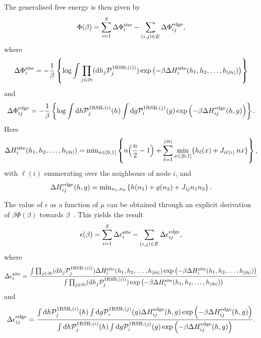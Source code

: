 \documentclass[11pt,a4paper]{article}
\begin{document}
The generalised free energy is then given by 
\begin{equation}
\Phi(\beta) = \sum^S_{i=1}\Delta \Phi^{\rm site}_i - \sum_{(i,j)\in E}\Delta \Phi^{\rm edge}_{ij},
\end{equation}
where 
\begin{eqnarray}
\Delta \Phi^{\rm site}_i =  -\frac{1}{\beta} \left\{ \log  \int \prod_{j\in \partial i}({\rm d}h_j \mathcal{P}^{{\rm 1RSB},(i))}_j)  \exp\left(-\beta \Delta H^{\rm site}_i(h_{1},h_2,\ldots,h_{|\partial i|}) \right) \right\}
\end{eqnarray}
and 
\begin{equation}
\Delta \Phi^{\rm edge}_{ij} = -\frac{1}{\beta} \left\{ \log  \int  {\rm d}h \mathcal{P}^{{\rm 1RSB},(i)}_j(h)   \int  {\rm d}g \mathcal{P}^{{\rm 1RSB},(j)}_i (g)   \exp\left(-\beta \Delta H^{\rm edge}_{ij}(h,g) \right) \right\} . 
\end{equation}
Here  
\begin{eqnarray}
\Delta H^{\rm site}_i(h_{1},h_2,\ldots,h_{|\partial i|}) = {\rm min}_{n\in [0,1]}\left\{ n\!\left(\frac{n}{2}-1\right)
      + \sum^{|\partial i|}_{\ell=1 } \min_{x\in[0,1]}\{h_\ell(x)+J_{ i \ell(i)} \:  n x\}\right\}, 
\end{eqnarray}
with $\ell(i)$ enumerating over the neighbours of node $i$,
and 
\begin{eqnarray}
\Delta H^{\rm edge}_{ij}(h,g) = {\rm min}_{n_1,n_2} \left\{h(n_1) +  g(n_2) + J_{ij}n_1n_2\right\}.
\end{eqnarray}



The value of $\epsilon$ as a function of $\mu$ can be obtained through an explicit derivation of $\beta\Phi(\beta)$ towards $\beta$~\cite{mezard2003cavity}.  This yields the result 
\begin{equation}
\epsilon(\beta) = \sum^S_{i=1}\Delta \epsilon^{\rm site}_i - \sum_{(i,j)\in E}\Delta \epsilon^{\rm edge}_{ij},
\end{equation} 
where 
\begin{equation}
\Delta \epsilon^{\rm site}_i = \frac{\int \prod_{j\in \partial i}({\rm d}h_j \mathcal{P}^{{\rm 1RSB},(i))}_j)   \Delta H^{\rm site}_i(h_{1},h_2,\ldots,h_{|\partial i|})\exp\left(-\beta \Delta H^{\rm site}_i(h_{1},h_2,\ldots,h_{|\partial i|}) \right)}{\int \prod_{j\in \partial i}({\rm d}h_j \mathcal{P}^{{\rm 1RSB},(i))}_j)  \exp\left(-\beta \Delta H^{\rm site}_i(h_{1},h_2,\ldots,h_{|\partial i|}) \right)}
\end{equation} 
and 
\begin{equation}
\Delta \epsilon^{\rm edge}_{ij} =  \frac{ \int  {\rm d}h \mathcal{P}^{{\rm 1RSB},(i)}_j(h)   \int  {\rm d}g \mathcal{P}^{{\rm 1RSB},(j)}_i (g) \Delta H^{\rm edge}_{ij}(h,g)  \exp\left(-\beta \Delta H^{\rm edge}_{ij}(h,g) \right) }{ \int  {\rm d}h \mathcal{P}^{{\rm 1RSB},(i)}_j(h)   \int  {\rm d}g \mathcal{P}^{{\rm 1RSB},(j)}_i (g)   \exp\left(-\beta \Delta H^{\rm edge}_{ij}(h,g) \right) } .
\end{equation} 
\end{document}
